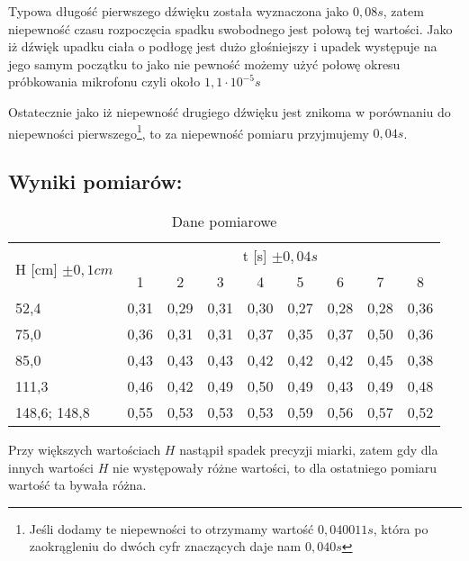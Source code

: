 \documentclass[a4paper,12pt]{article}
\begin{document}
Typowa długość pierwszego dźwięku została wyznaczona jako $0,08s$, zatem niepewność czasu rozpoczęcia spadku swobodnego jest połową tej wartości. Jako iż dźwięk upadku ciała o podłogę jest dużo głośniejszy i upadek występuje na jego samym początku to jako nie pewność możemy użyć połowę okresu próbkowania mikrofonu czyli około $1,1 \cdot 10^{-5}s$

Ostatecznie jako iż niepewność drugiego dźwięku jest znikoma w porównaniu do niepewności pierwszego\footnote{Jeśli dodamy te niepewności to otrzymamy wartość $0,040011s$, która po zaokrągleniu do dwóch cyfr znaczących daje nam $0,040s$}, to za niepewność pomiaru przyjmujemy $0,04s$.

\subsection*{Wyniki pomiarów:}

\begin{table}[h]
\centering
\begin{tabular}{|l|l|l|l|l|l|l|l|l|}
\hline
\multicolumn{1}{|c|}{\multirow{2}{*}{H [cm] $\pm 0,1cm$}} & \multicolumn{8}{c|}{t [s] $\pm 0,04s$}                \\ \cline{2-9} 
\multicolumn{1}{|c|}{} &
  \multicolumn{1}{c|}{1} &
  \multicolumn{1}{c|}{2} &
  \multicolumn{1}{c|}{3} &
  \multicolumn{1}{c|}{4} &
  \multicolumn{1}{c|}{5} &
  \multicolumn{1}{c|}{6} &
  \multicolumn{1}{c|}{7} &
  \multicolumn{1}{c|}{8} \\ \hline\hline
52,4                                                     & 0,31 & 0,29 & 0,31 & 0,30 & 0,27 & 0,28 & 0,28 & 0,36 \\ \hline
75,0                                                     & 0,36 & 0,31 & 0,31 & 0,37 & 0,35 & 0,37 & 0,50 & 0,36 \\ \hline
85,0                                                       & 0,43 & 0,43 & 0,43 & 0,42 & 0,42 & 0,42 & 0,45 & 0,38 \\ \hline
111,3                                                    & 0,46 & 0,42 & 0,49 & 0,50 & 0,49 & 0,43 & 0,49 & 0,48 \\ \hline
148,6; 148,8                                                    & 0,55 & 0,53 & 0,53 & 0,53 & 0,59 & 0,56 & 0,57 & 0,52 \\ \hline
\end{tabular}
\caption{Dane pomiarowe}
\label{tab:raw}
\end{table}

Przy większych wartościach $H$ nastąpił spadek precyzji miarki, zatem gdy dla innych wartości $H$ nie występowały różne wartości, to dla ostatniego pomiaru wartość ta bywała różna.
\end{document}
